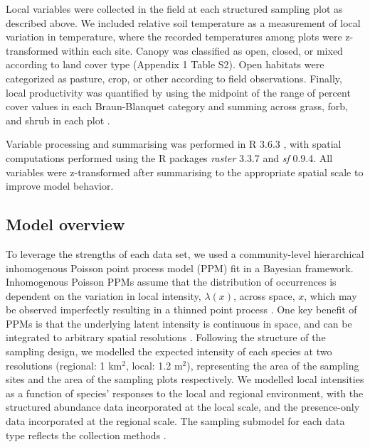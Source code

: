 \documentclass[preprint,review,times,12pt,3p]{elsarticle}
\begin{document}
Local variables were collected in the field at each structured sampling plot as described above. We included relative soil temperature as a measurement of local variation in temperature, where the recorded temperatures among plots were z-transformed within each site. Canopy was classified as open, closed, or mixed according to land cover type (Appendix 1 Table S2). Open habitats were categorized as pasture, crop, or other according to field observations. Finally, local productivity was quantified by using the midpoint of the range of percent cover values in each Braun-Blanquet category and summing across grass, forb, and shrub in each plot \citep{Douglas1978,Mccain2018,Szewczyk2018}.

Variable processing and summarising was performed in R 3.6.3 \citep{R-3-6-3}, with spatial computations performed using the R packages \emph{raster} 3.3.7 and \emph{sf} 0.9.4. All variables were z-transformed after summarising to the appropriate spatial scale to improve model behavior.


\subsection{Model overview}
To leverage the strengths of each data set, we used a community-level hierarchical inhomogenous Poisson point process model (PPM) fit in a Bayesian framework. Inhomogenous Poisson PPMs assume that the distribution of occurrences is dependent on the variation in local intensity, $\lambda(x)$, across space, $x$, which may be observed imperfectly resulting in a thinned point process \citep{Warton2010,Baddeley2015,Fithian2015}. One key benefit of PPMs is that the underlying latent intensity is continuous in space, and can be integrated to arbitrary spatial resolutions \citep{Renner2015,Hefley2016,Koshkina2017a,Fletcher2019}. Following the structure of the sampling design, we modelled the expected intensity of each species at two resolutions (regional: 1 km$^2$, local: 1.2 m$^2$), representing the area of the sampling sites and the area of the sampling plots respectively. We modelled local intensities as a function of species' responses to the local and regional environment, with the structured abundance data incorporated at the local scale, and the presence-only data incorporated at the regional scale. The sampling submodel for each data type reflects the collection methods \citep{Isaac2014,Hefley2016,Fletcher2019,Miller2019}.
\end{document}

